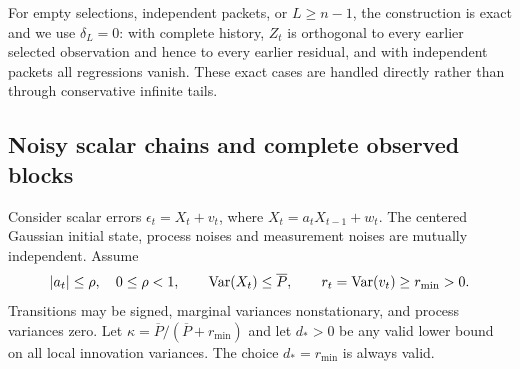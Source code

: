 For empty selections, independent packets, or $L\ge n-1$, the construction
is exact and we use $\delta_L=0$: with complete history, $Z_t$ is orthogonal
to every earlier selected observation and hence to every earlier residual,
and with independent packets all regressions vanish. These exact cases are
handled directly rather than through conservative infinite tails.

\subsection{Noisy scalar chains and complete observed blocks}
\label{subsec:noisy-markov}
Consider scalar errors $\epsilon_t=X_t+v_t$, where
$X_t=a_tX_{t-1}+w_t$. The centered Gaussian initial state, process noises
and measurement noises are mutually independent. Assume
\begin{equation}
 |a_t|\le\rho,\quad 0\le\rho<1,\qquad \operatorname{Var}(X_t)\le\overline P,
 \qquad r_t=\operatorname{Var}(v_t)\ge r_{\min}>0.
 \label{eq:scalar-promises}
\end{equation}
Transitions may be signed, marginal variances nonstationary, and process
variances zero. Let $\kappa=\overline P/(\overline P+r_{\min})$ and let
$d_*>0$ be any valid lower bound on all local innovation variances.
The choice $d_*=r_{\min}$ is always valid.

